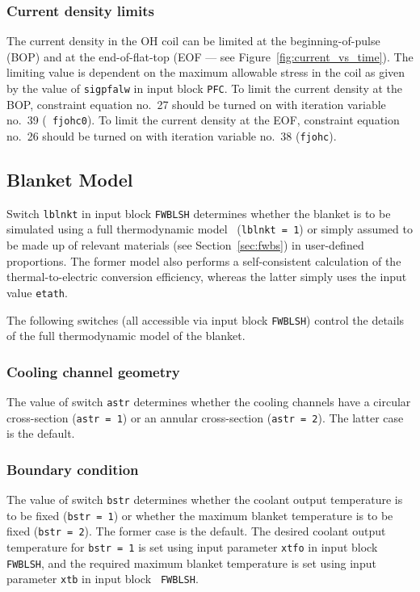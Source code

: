 \subsubsection{Current density limits}

The current density in the OH coil can be limited at the beginning-of-pulse
(BOP) and at the end-of-flat-top (EOF --- see
Figure~\ref{fig:current_vs_time}). The limiting value is dependent on the
maximum allowable stress in the coil as given by the value of {\tt sigpfalw}
in input block {\tt PFC}. To limit the current density at the BOP, constraint
equation no.\ 27 should be turned on with iteration variable no.\ 39 ({\tt
fjohc0}). To limit the current density at the EOF, constraint equation no.\ 26
should be turned on with iteration variable no.\ 38 ({\tt fjohc}).

\subsection{Blanket Model}

Switch {\tt lblnkt} in input block {\tt FWBLSH} determines whether the blanket
is to be simulated using a full thermodynamic model~\cite{Panos} ({\tt lblnkt
= 1}) or simply assumed to be made up of relevant materials (see
Section~\ref{sec:fwbs}) in user-defined proportions. The former model also
performs a self-consistent calculation of the thermal-to-electric conversion
efficiency, whereas the latter simply uses the input value {\tt etath}.
\setlength{\parskip}{5mm}

The following switches (all accessible via input block {\tt FWBLSH}) control
the details of the full thermodynamic model of the blanket.
\setlength{\parskip}{0mm}

\subsubsection{Cooling channel geometry}

The value of switch {\tt astr} determines whether the cooling channels have a
circular cross-section ({\tt astr = 1}) or an annular cross-section ({\tt astr
= 2}). The latter case is the default.

\subsubsection{Boundary condition}

The value of switch {\tt bstr} determines whether the coolant output
temperature is to be fixed ({\tt bstr = 1}) or whether the maximum blanket
temperature is to be fixed ({\tt bstr~=~2}). The former case is the default.
The desired coolant output temperature for {\tt bstr = 1} is set using input
parameter {\tt xtfo} in input block {\tt FWBLSH}, and the required maximum
blanket temperature is set using input parameter {\tt xtb} in input block {\tt
FWBLSH}.

